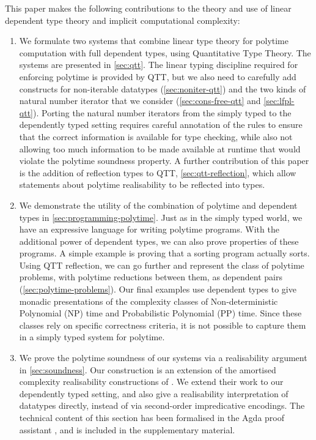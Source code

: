 \documentclass[acmsmall,screen]{acmart}
\begin{document}
This paper makes the following contributions to the theory and use of
linear dependent type theory and implicit computational complexity:
\begin{enumerate}
\item We formulate two systems that combine linear type theory for
  polytime computation with full dependent types, using Quantitative
  Type Theory. The systems are presented in \autoref{sec:qtt}. The
  linear typing discipline required for enforcing polytime is provided
  by QTT, but we also need to carefully add constructs for
  non-iterable datatypes (\autoref{sec:noniter-qtt}) and the two kinds
  of natural number iterator that we consider
  (\autoref{sec:cons-free-qtt} and \autoref{sec:lfpl-qtt}). Porting
  the natural number iterators from the simply typed to the
  dependently typed setting requires careful annotation of the rules
  to ensure that the correct information is available for type
  checking, while also not allowing too much information to be made
  available at runtime that would violate the polytime soundness
  property. A further contribution of this paper is the addition of
  reflection types to QTT, \autoref{sec:qtt-reflection}, which allow
  statements about polytime realisability to be reflected into
  types. %
\item We demonstrate the utility of the combination of polytime and
  dependent types in \autoref{sec:programming-polytime}. Just as in
  the simply typed world, we have an expressive language for writing
  polytime programs. With the additional power of dependent types, we
  can also prove properties of these programs. A simple example is
  proving that a sorting program actually sorts. Using QTT reflection,
  we can go further and represent the class of polytime problems, with
  polytime reductions between them, as dependent pairs
  (\autoref{sec:polytime-problems}). Our final examples use dependent
  types to give monadic presentations of the complexity classes of
  Non-deterministic Polynomial (NP) time and Probabilistic Polynomial
  (PP) time. Since these classes rely on specific correctness
  criteria, it is not possible to capture them in a simply typed
  system for polytime.
\item We prove the polytime soundness of our systems via a
  realisability argument in \autoref{sec:soundness}. Our construction
  is an extension of the amortised complexity realisability
  constructions of \citet{dallago11realisability}. We extend their
  work to our dependently typed setting, and also give a realisability
  interpretation of datatypes directly, instead of via second-order
  impredicative encodings. The technical content of this section has
  been formalised in the Agda proof assistant
  \cite{norell2008dependently}, and is included in the supplementary
  material.
\end{enumerate}
\end{document}

